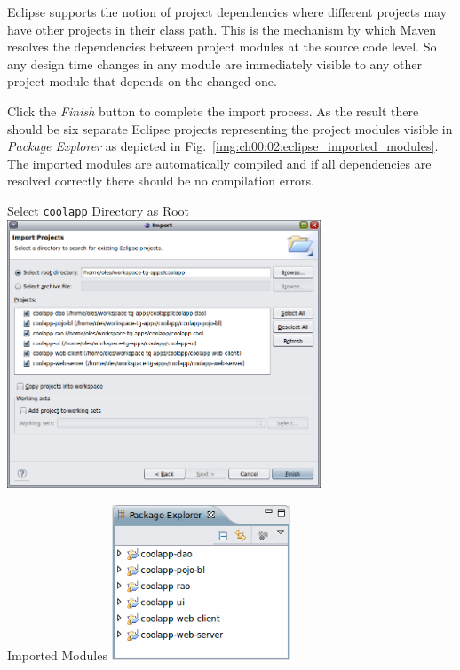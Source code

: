   Eclipse supports the notion of project dependencies where different projects may have other projects in their class path.
  This is the mechanism by which Maven resolves the dependencies between project modules at the source code level.
  So any design time changes in any module are immediately visible to any other project module that depends on the changed one.

  Click the \emph{Finish} button to complete the import process.
  As the result there should be six separate Eclipse projects representing the project modules visible in \emph{Package Explorer} as depicted in Fig.~\ref{img:ch00:02:eclipse_imported_modules}.
  The imported modules are automatically compiled and if all dependencies are resolved correctly there should be no compilation errors.

  \begin{image}{Select \texttt{coolapp} Directory as Root}{\label{img:ch00:02:eclipse_importing_root}}    
    \includegraphics[width=0.7\textwidth]{parts/00-part/chapters/01-application-modules/images/10-eclipse-importing.png}
  \end{image}
 
  \begin{image}{Imported Modules}{\label{img:ch00:02:eclipse_imported_modules}}    
    \includegraphics[width=0.4\textwidth]{parts/00-part/chapters/01-application-modules/images/11-eclipse-imported-modules.png}
  \end{image}  
 

